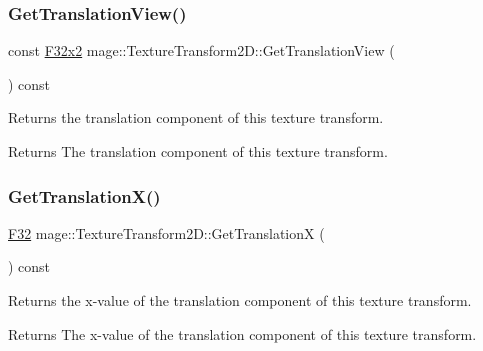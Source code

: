 \subsubsection{\texorpdfstring{Get\+Translation\+View()}{GetTranslationView()}}
{\footnotesize\ttfamily const \mbox{\hyperlink{namespacemage_aee4759dedc8def6c6dec26b5c7eddf29}{F32x2}} mage\+::\+Texture\+Transform2\+D\+::\+Get\+Translation\+View (\begin{DoxyParamCaption}{ }\end{DoxyParamCaption}) const\hspace{0.3cm}{\ttfamily [noexcept]}}

Returns the translation component of this texture transform.

\begin{DoxyReturn}{Returns}
The translation component of this texture transform. 
\end{DoxyReturn}
\mbox{\label{classmage_1_1_texture_transform2_d_a66ff936a85a8ae326ab5c02b4db76cdf}} 
\subsubsection{\texorpdfstring{Get\+Translation\+X()}{GetTranslationX()}}
{\footnotesize\ttfamily \mbox{\hyperlink{namespacemage_aa97e833b45f06d60a0a9c4fc22ae02c0}{F32}} mage\+::\+Texture\+Transform2\+D\+::\+Get\+TranslationX (\begin{DoxyParamCaption}{ }\end{DoxyParamCaption}) const\hspace{0.3cm}{\ttfamily [noexcept]}}

Returns the x-\/value of the translation component of this texture transform.

\begin{DoxyReturn}{Returns}
The x-\/value of the translation component of this texture transform. 
\end{DoxyReturn}
\mbox{\label{classmage_1_1_texture_transform2_d_a89c758d9fa036da9686b474b060f8028}} 
